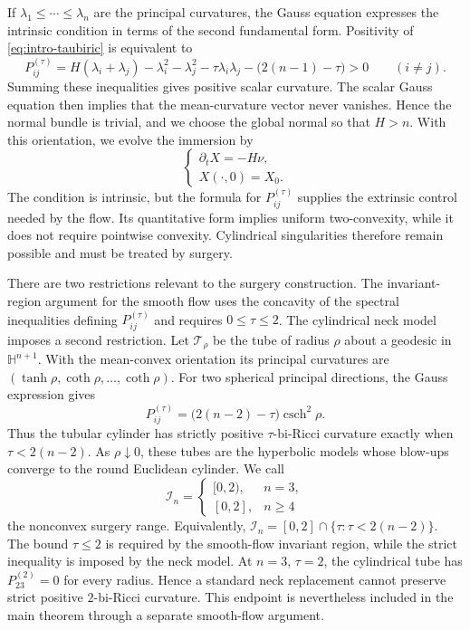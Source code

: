 \documentclass[11pt,reqno]{amsart}
\theoremstyle{definition}
\theoremstyle{remark}
\numberwithin{equation}{section}
\newcommand{\Hh}{\mathbb H}
\begin{document}
If $\lambda_1\leq\cdots\leq\lambda_n$ are the principal curvatures, the
Gauss equation expresses the intrinsic condition in terms of the second
fundamental form.  Positivity of \eqref{eq:intro-taubiric} is equivalent to
\begin{equation*}
 P_{ij}^{(\tau)}
 =H(\lambda_i+\lambda_j)-\lambda_i^2-\lambda_j^2
  -\tau\lambda_i\lambda_j-\bigl(2(n-1)-\tau\bigr)>0
 \qquad(i\ne j).
\end{equation*}
Summing these inequalities gives positive scalar curvature.  The scalar Gauss
equation then implies that the mean-curvature vector never vanishes.  Hence the
normal bundle is trivial, and we choose the global normal so that $H>n$.  With
this orientation, we evolve the immersion by
\begin{equation}\label{eq:mcf}
\begin{cases}
    \partial_tX=-H\nu,\\
    X(\cdot,0)=X_0.
\end{cases}
\end{equation}
The condition is intrinsic, but the formula for $P_{ij}^{(\tau)}$ supplies the
extrinsic control needed by the flow.  Its quantitative form implies uniform
two-convexity, while it does not require pointwise convexity.  Cylindrical
singularities therefore remain possible and must be treated by surgery.

There are two restrictions relevant to the surgery construction.  The
invariant-region argument for the smooth flow uses the concavity of the
spectral inequalities defining $P_{ij}^{(\tau)}$ and requires
$0\leq\tau\leq2$.  The cylindrical neck model imposes a second restriction.
Let $\mathcal T_\rho$ be the tube of radius $\rho$ about a geodesic in
$\Hh^{n+1}$.  With the mean-convex orientation its principal curvatures are
$(\tanh\rho,\coth\rho,\ldots,\coth\rho)$.  For two spherical principal
directions, the Gauss expression gives
\begin{equation*}
 P_{ij}^{(\tau)}
 =\bigl(2(n-2)-\tau\bigr)\operatorname{csch}^2\rho.
\end{equation*}
Thus the tubular cylinder has strictly positive $\tau$-bi-Ricci curvature
exactly when $\tau<2(n-2)$.  As $\rho\downarrow0$, these tubes are the
hyperbolic models whose blow-ups converge to the round Euclidean cylinder.
We call
\begin{equation*}
 \mathcal I_n=
 \begin{cases}
 [0,2),&n=3,\\
 [0,2],&n\geq4
 \end{cases}
\end{equation*}
the nonconvex surgery range.  Equivalently, $\mathcal I_n=[0,2]\cap\{\tau:\tau<2(n-2)\}$.  
The bound $\tau\leq2$ is required by the smooth-flow invariant region, while
the strict inequality is imposed by the neck model.  At $n=3$, $\tau=2$,
the cylindrical tube has $P_{23}^{(2)}=0$ for every radius.  Hence a standard
neck replacement cannot preserve strict positive $2$-bi-Ricci curvature.
This endpoint is nevertheless included in the main theorem through a
separate smooth-flow argument.
\end{document}

